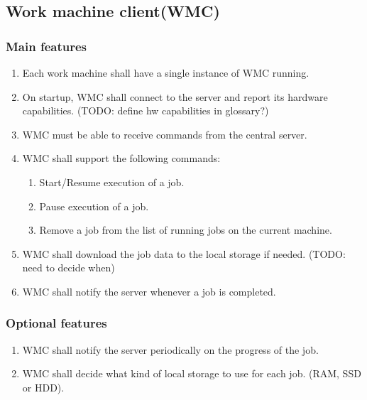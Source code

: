\subsection{Work machine client(WMC)}
\subsubsection{Main features}
\begin{enumerate}
  \item Each work machine shall have a single instance of WMC running.
  \item On startup, WMC shall connect to the server and report its hardware capabilities. (TODO: define hw capabilities in glossary?)
  \item WMC must be able to receive commands from the central server.
  \item WMC shall support the following commands:
  \begin{enumerate}
    \item Start/Resume execution of a job.
    \item Pause execution of a job.
    \item Remove a job from the list of running jobs on the current machine.
  \end{enumerate}
  \item WMC shall download the job data to the local storage if needed. (TODO: need to decide when)
  \item WMC shall notify the server whenever a job is completed.
\end{enumerate}
\subsubsection{Optional features}
  \begin{enumerate}
    \item WMC shall notify the server periodically on the progress of the job.
    \item WMC shall decide what kind of local storage to use for each job. (RAM, SSD or HDD).
  \end{enumerate}
